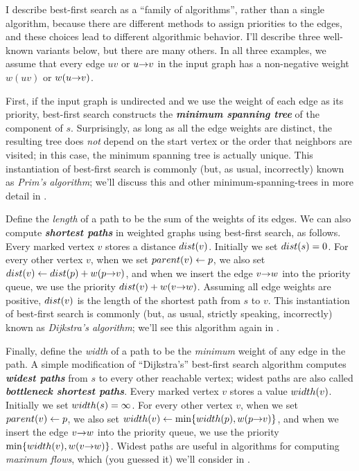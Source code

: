 I describe best-first search as a “family of algorithms”, rather than a single algorithm, because there are different methods to assign priorities to the edges, and these choices lead to different algorithmic behavior.
I’ll describe three well-known variants below, but there are many others.
In all three examples, we assume that every edge $uv$ or $u\mathord{\rightarrow}v$ in the input graph has a non-negative weight $w(uv)$ or $w(u\mathord{\rightarrow}v)$.

First, if the input graph is undirected and we use the weight of each edge as its priority, best-first search constructs the \textbf{\textit{minimum spanning tree}} of the component of $s$.
Surprisingly, as long as all the edge weights are distinct, the resulting tree does \textit{not} depend on the start vertex or the order that neighbors are visited; in this case, the minimum spanning tree is actually unique.
This instantiation of best-first search is commonly (but, as usual, incorrectly) known as \textit{Prim’s algorithm}; we’ll discuss this and other minimum-spanning-trees in more detail in .

Define the \textit{length} of a path to be the sum of the weights of its edges.
We can also compute \textbf{\textit{shortest paths}} in weighted graphs using best-first search, as follows.
Every marked vertex $v$ stores a distance $dist(v)$.
Initially we set $dist(s) = 0$.
For every other vertex $v$, when we set $parent(v) \gets p$, we also set $dist(v) \gets dist(p) + w(p\mathord{\rightarrow}v)$, and when we insert the edge $v\mathord{\rightarrow}w$ into the priority queue, we use the priority $dist(v) + w(v\mathord{\rightarrow}w)$.
Assuming all edge weights are positive, $dist(v)$ is the length of the shortest path from $s$ to $v$.
This instantiation of best-first search is commonly (but, as usual, strictly speaking, incorrectly) known as \textit{Dijkstra’s algorithm}; we’ll see this algorithm again in .

Finally, define the \textit{width} of a path to be the \textit{minimum} weight of any edge in the path.
A simple modification of “Dijkstra’s” best-first search algorithm computes \textbf{\textit{widest paths}} from $s$ to every other reachable vertex; widest paths are also called \textbf{\textit{bottleneck shortest paths}}.
Every marked vertex $v$ stores a value $width(v)$.
Initially we set $width(s) = \infty$.
For every other vertex $v$, when we set $parent(v) \gets p$, we also set $width(v) \gets \min\{width(p), w(p\mathord{\rightarrow}v)\}$, and when we insert the edge $v\mathord{\rightarrow}w$ into the priority queue, we use the priority $\min\{width(v), w(v\mathord{\rightarrow}w)\}$.
Widest paths are useful in algorithms for computing \textit{maximum flows}, which (you guessed it) we’ll consider in .

